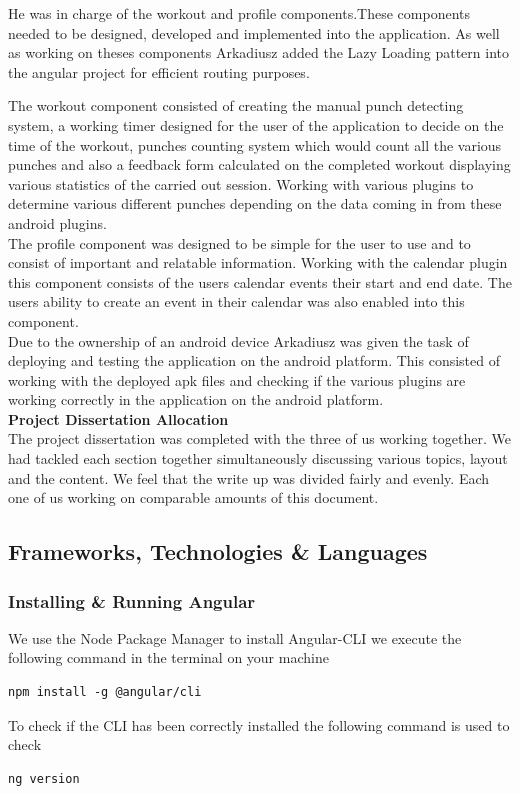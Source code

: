 \documentclass[a4paper,12pt]{report}
\begin{document}
He was in charge of the workout and  profile components.These components needed to be designed, developed and implemented into the application.
As well as working on theses components Arkadiusz added the Lazy Loading pattern into the angular project for efficient routing purposes.

The workout component consisted of creating the manual punch detecting system, a working timer designed for the user of the application to decide on the time of the workout, punches counting system which would count all the various punches and also a feedback form calculated on the completed workout displaying various statistics of the carried out session.
Working with various plugins to determine various different punches depending on the data coming in from these android plugins.\\

The profile component was designed to be simple for the user to use and to consist of important and relatable information.
Working with the calendar plugin this component consists of the users calendar events their start and end date. The users ability to create an event in their calendar was also enabled into this component.\\

Due to the ownership of an android device Arkadiusz was given the task of deploying and testing the application on the android platform. This consisted of working with the deployed apk files and checking if the various plugins are working correctly in the application on the android platform. \\

\textbf{Project Dissertation Allocation}\\
The project dissertation was completed with the three of us working together. We had tackled each section together simultaneously discussing various topics, layout and the content.
We feel that the write up was divided fairly and evenly. Each one of us working on comparable amounts of this document.


\subsection{Frameworks, Technologies \& Languages}
\subsubsection{Installing \& Running Angular}
We use the Node Package Manager to install Angular-CLI we execute the following command in the terminal on your machine 
\begin{verbatim}
npm install -g @angular/cli
\end{verbatim}
To check if the CLI has been correctly installed the following command is used to check
\begin{verbatim}
ng version
\end{verbatim}
\end{document}

